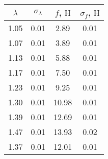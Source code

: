 \begin{tabular}{cc|cc}
\toprule
$\lambda$ & $\sigma_{\lambda}$ & $f$, $Н$ & $\sigma_{f}$, $Н$ \\
\midrule
1.05 & 0.01 & 2.89 & 0.01 \\
1.07 & 0.01 & 3.89 & 0.01 \\
1.13 & 0.01 & 5.88 & 0.01 \\
1.17 & 0.01 & 7.50 & 0.01 \\
1.23 & 0.01 & 9.25 & 0.01 \\
1.30 & 0.01 & 10.98 & 0.01 \\
1.39 & 0.01 & 12.69 & 0.01 \\
1.47 & 0.01 & 13.93 & 0.02 \\
1.37 & 0.01 & 12.01 & 0.01 \\
\bottomrule
\end{tabular}
